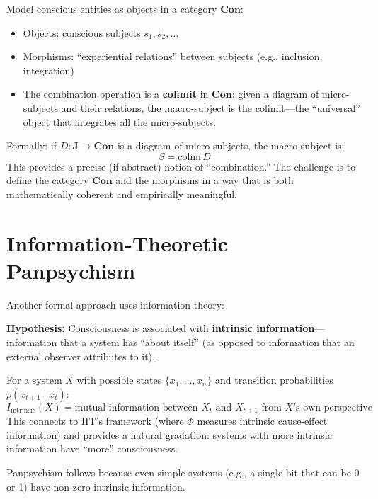 \documentclass[11pt,a4paper]{report}
\begin{document}
\begin{mathbox}
\vspace{-6pt}
Model conscious entities as objects in a category $\mathbf{Con}$:
\begin{itemize}[leftmargin=1.5em]
  \item Objects: conscious subjects $s_1, s_2, \ldots$
  \item Morphisms: ``experiential relations'' between subjects (e.g., inclusion, integration)
  \item The combination operation is a \textbf{colimit} in $\mathbf{Con}$: given a diagram of micro-subjects and their relations, the macro-subject is the colimit---the ``universal'' object that integrates all the micro-subjects.
\end{itemize}
Formally: if $D : \mathbf{J} \to \mathbf{Con}$ is a diagram of micro-subjects, the macro-subject is:
\[
  S = \text{colim}\, D
\]
This provides a precise (if abstract) notion of ``combination.'' The challenge is to define the category $\mathbf{Con}$ and the morphisms in a way that is both mathematically coherent and empirically meaningful.
\vspace{-4pt}
\end{mathbox}

\section{Information-Theoretic Panpsychism}

Another formal approach uses information theory:

\begin{mathbox}
\vspace{-6pt}
\textbf{Hypothesis:} Consciousness is associated with \textbf{intrinsic information}---information that a system has ``about itself'' (as opposed to information that an external observer attributes to it).

For a system $X$ with possible states $\{x_1, \ldots, x_n\}$ and transition probabilities $p(x_{t+1} \mid x_t)$:
\[
  I_{\text{intrinsic}}(X) = \text{mutual information between } X_t \text{ and } X_{t+1} \text{ from } X\text{'s own perspective}
\]
This connects to IIT's framework (where $\Phi$ measures intrinsic cause-effect information) and provides a natural gradation: systems with more intrinsic information have ``more'' consciousness.

Panpsychism follows because even simple systems (e.g., a single bit that can be 0 or 1) have non-zero intrinsic information.
\vspace{-4pt}
\end{mathbox}
\end{document}

